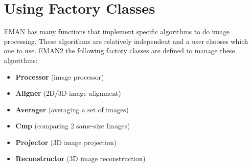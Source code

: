 \section {Using Factory Classes}
  \label{FACTORY-CLASSES} 


EMAN has many functions that implement specific algorithms to do image
processing.  These algorithms are relatively independent and a user
chooses which one to use. EMAN2 the following factory classes are defined to
manage these algorithms:

\begin{itemize}

  \item
    \textbf{Processor} (image processor)
  \item
    \textbf{Aligner} (2D/3D image alignment)
  \item
    \textbf{Averager} (averaging a set of images)
  \item
    \textbf{Cmp} (comparing 2 same-size Images)
  \item
    \textbf{Projector} (3D image projection)
  \item
    \textbf{Reconstructor} (3D image reconstruction)

\end{itemize}